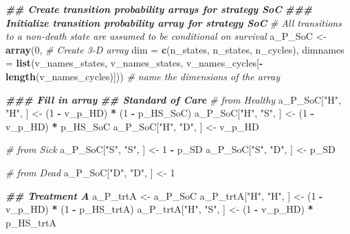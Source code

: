 \documentclass[
]{article}
\newenvironment{Shaded}{\begin{snugshade}}{\end{snugshade}}
\newcommand{\AttributeTok}[1]{\textcolor[rgb]{0.13,0.29,0.53}{#1}}
\newcommand{\CommentTok}[1]{\textcolor[rgb]{0.56,0.35,0.01}{\textit{#1}}}
\newcommand{\DecValTok}[1]{\textcolor[rgb]{0.00,0.00,0.81}{#1}}
\newcommand{\DocumentationTok}[1]{\textcolor[rgb]{0.56,0.35,0.01}{\textbf{\textit{#1}}}}
\newcommand{\FunctionTok}[1]{\textcolor[rgb]{0.13,0.29,0.53}{\textbf{#1}}}
\newcommand{\NormalTok}[1]{#1}
\newcommand{\OtherTok}[1]{\textcolor[rgb]{0.56,0.35,0.01}{#1}}
\newcommand{\SpecialCharTok}[1]{\textcolor[rgb]{0.81,0.36,0.00}{\textbf{#1}}}
\newcommand{\StringTok}[1]{\textcolor[rgb]{0.31,0.60,0.02}{#1}}
\begin{document}
\begin{Shaded}
\begin{Highlighting}[]
\DocumentationTok{\#\# Create transition probability arrays for strategy SoC }
\DocumentationTok{\#\#\# Initialize transition probability array for strategy SoC }
\CommentTok{\# All transitions to a non{-}death state are assumed to be conditional on survival}
\NormalTok{a\_P\_SoC }\OtherTok{\textless{}{-}} \FunctionTok{array}\NormalTok{(}\DecValTok{0}\NormalTok{,  }\CommentTok{\# Create 3{-}D array}
                \AttributeTok{dim =} \FunctionTok{c}\NormalTok{(n\_states, n\_states, n\_cycles),}
                \AttributeTok{dimnames =} \FunctionTok{list}\NormalTok{(v\_names\_states, v\_names\_states, }
\NormalTok{                                v\_names\_cycles[}\SpecialCharTok{{-}}\FunctionTok{length}\NormalTok{(v\_names\_cycles)])) }\CommentTok{\# name the dimensions of the array }

\DocumentationTok{\#\#\# Fill in array}
\DocumentationTok{\#\# Standard of Care}
\CommentTok{\# from Healthy}
\NormalTok{a\_P\_SoC[}\StringTok{"H"}\NormalTok{, }\StringTok{"H"}\NormalTok{, ] }\OtherTok{\textless{}{-}}\NormalTok{ (}\DecValTok{1} \SpecialCharTok{{-}}\NormalTok{ v\_p\_HD) }\SpecialCharTok{*}\NormalTok{ (}\DecValTok{1} \SpecialCharTok{{-}}\NormalTok{ p\_HS\_SoC)}
\NormalTok{a\_P\_SoC[}\StringTok{"H"}\NormalTok{, }\StringTok{"S"}\NormalTok{, ] }\OtherTok{\textless{}{-}}\NormalTok{ (}\DecValTok{1} \SpecialCharTok{{-}}\NormalTok{ v\_p\_HD) }\SpecialCharTok{*}\NormalTok{      p\_HS\_SoC}
\NormalTok{a\_P\_SoC[}\StringTok{"H"}\NormalTok{, }\StringTok{"D"}\NormalTok{, ] }\OtherTok{\textless{}{-}}\NormalTok{      v\_p\_HD}

\CommentTok{\# from Sick}
\NormalTok{a\_P\_SoC[}\StringTok{"S"}\NormalTok{, }\StringTok{"S"}\NormalTok{, ] }\OtherTok{\textless{}{-}} \DecValTok{1} \SpecialCharTok{{-}}\NormalTok{ p\_SD}
\NormalTok{a\_P\_SoC[}\StringTok{"S"}\NormalTok{, }\StringTok{"D"}\NormalTok{, ] }\OtherTok{\textless{}{-}}\NormalTok{     p\_SD}

\CommentTok{\# from Dead}
\NormalTok{a\_P\_SoC[}\StringTok{"D"}\NormalTok{, }\StringTok{"D"}\NormalTok{, ] }\OtherTok{\textless{}{-}} \DecValTok{1}

\DocumentationTok{\#\# Treatment A}
\NormalTok{a\_P\_trtA }\OtherTok{\textless{}{-}}\NormalTok{ a\_P\_SoC}
\NormalTok{a\_P\_trtA[}\StringTok{"H"}\NormalTok{, }\StringTok{"H"}\NormalTok{, ] }\OtherTok{\textless{}{-}}\NormalTok{ (}\DecValTok{1} \SpecialCharTok{{-}}\NormalTok{ v\_p\_HD) }\SpecialCharTok{*}\NormalTok{ (}\DecValTok{1} \SpecialCharTok{{-}}\NormalTok{ p\_HS\_trtA)}
\NormalTok{a\_P\_trtA[}\StringTok{"H"}\NormalTok{, }\StringTok{"S"}\NormalTok{, ] }\OtherTok{\textless{}{-}}\NormalTok{ (}\DecValTok{1} \SpecialCharTok{{-}}\NormalTok{ v\_p\_HD) }\SpecialCharTok{*}\NormalTok{      p\_HS\_trtA}


\end{Highlighting}
\end{Shaded}
\end{document}
